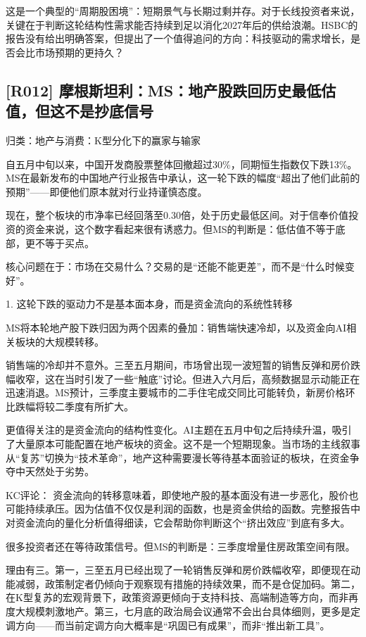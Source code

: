 \documentclass[11pt]{ctexart}
\begin{document}
这是一个典型的“周期股困境”：短期景气与长期过剩并存。对于长线投资者来说，关键在于判断这轮结构性需求能否持续到足以消化2027年后的供给浪潮。HSBC的报告没有给出明确答案，但提出了一个值得追问的方向：科技驱动的需求增长，是否会比市场预期的更持久？

\subsection{[R012] 摩根斯坦利：MS：地产股跌回历史最低估值，但这不是抄底信号}
{\small\color{refgray}归类：地产与消费：K型分化下的赢家与输家}

自五月中旬以来，中国开发商股票整体回撤超过30\%，同期恒生指数仅下跌13\%。MS在最新发布的中国地产行业报告中承认，这一轮下跌的幅度“超出了他们此前的预期”——即便他们原本就对行业持谨慎态度。

现在，整个板块的市净率已经回落至0.30倍，处于历史最低区间。对于信奉价值投资的资金来说，这个数字看起来很有诱惑力。但MS的判断是：低估值不等于底部，更不等于买点。

核心问题在于：市场在交易什么？交易的是“还能不能更差”，而不是“什么时候变好”。

1. 这轮下跌的驱动力不是基本面本身，而是资金流向的系统性转移

MS将本轮地产股下跌归因为两个因素的叠加：销售端快速冷却，以及资金向AI相关板块的大规模转移。

销售端的冷却并不意外。三至五月期间，市场曾出现一波短暂的销售反弹和房价跌幅收窄，这在当时引发了一些“触底”讨论。但进入六月后，高频数据显示动能正在迅速消退。MS预计，三季度主要城市的二手住宅成交同比可能转负，新房价格环比跌幅将较二季度有所扩大。

更值得关注的是资金流向的结构性变化。AI主题在五月中旬之后持续升温，吸引了大量原本可能配置在地产板块的资金。这不是一个短期现象。当市场的主线叙事从“复苏”切换为“技术革命”，地产这种需要漫长等待基本面验证的板块，在资金争夺中天然处于劣势。

KC评论： 资金流向的转移意味着，即使地产股的基本面没有进一步恶化，股价也可能持续承压。因为估值不仅仅是利润的函数，也是资金供给的函数。完整报告中对资金流向的量化分析值得细读，它会帮助你判断这个“挤出效应”到底有多大。

很多投资者还在等待政策信号。但MS的判断是：三季度增量住房政策空间有限。

理由有三。第一，三至五月已经出现了一轮销售反弹和房价跌幅收窄，即便现在动能减弱，政策制定者仍倾向于观察现有措施的持续效果，而不是仓促加码。第二，在K型复苏的宏观背景下，政策资源更倾向于支持科技、高端制造等方向，而非再度大规模刺激地产。第三，七月底的政治局会议通常不会出台具体细则，更多是定调方向——而当前定调方向大概率是“巩固已有成果”，而非“推出新工具”。
\end{document}
